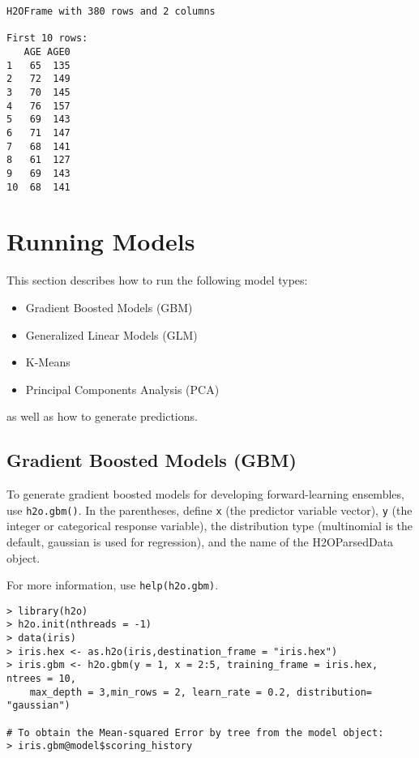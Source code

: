 {\begin{lstlisting}[style=R]
H2OFrame with 380 rows and 2 columns

First 10 rows:
   AGE AGE0
1   65  135
2   72  149
3   70  145
4   76  157
5   69  143
6   71  147
7   68  141
8   61  127
9   69  143
10  68  141
\end{lstlisting}


\section{Running Models}
\label{sec:RunModel}

This section describes how to run the following model types:

\begin{itemize}
\item Gradient Boosted Models (GBM)
\item Generalized Linear Models (GLM)
\item K-Means 
\item Principal Components Analysis (PCA)

\end{itemize}
as well as how to generate predictions. 


\subsection{Gradient Boosted Models (GBM)}
To generate gradient boosted models for developing forward-learning ensembles, use {\texttt{h2o.gbm()}}.  In the parentheses, define \texttt{x} (the predictor variable vector), \texttt{y} (the integer or categorical response variable), the distribution type (multinomial is the default, gaussian is used for regression), and the name of the H2OParsedData object. 

For more information, use {\texttt{help(h2o.gbm)}}.
\smallskip
\begin{lstlisting}[style=R]
> library(h2o)
> h2o.init(nthreads = -1)
> data(iris)
> iris.hex <- as.h2o(iris,destination_frame = "iris.hex")
> iris.gbm <- h2o.gbm(y = 1, x = 2:5, training_frame = iris.hex, ntrees = 10,
    max_depth = 3,min_rows = 2, learn_rate = 0.2, distribution= "gaussian")

# To obtain the Mean-squared Error by tree from the model object:
> iris.gbm@model$scoring_history


\end{lstlisting}}
